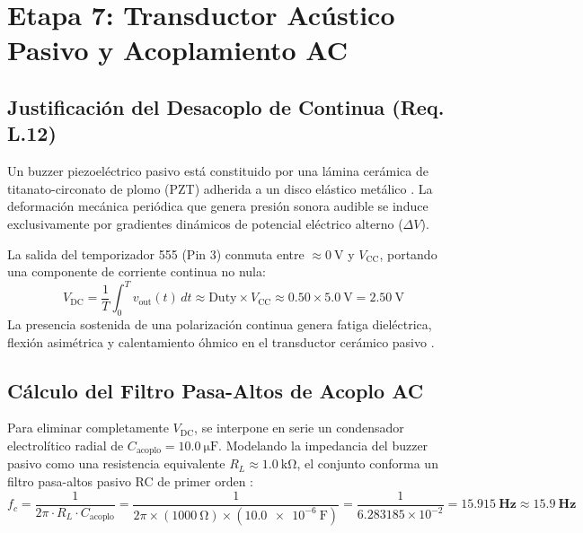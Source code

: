 \documentclass[11pt,letterpaper]{article}
\begin{document}
\section{Etapa 7: Transductor Acústico Pasivo y Acoplamiento AC}

\subsection{Justificación del Desacoplo de Continua (Req. L.12)}
Un buzzer piezoeléctrico pasivo está constituido por una lámina cerámica de titanato-circonato de plomo (PZT) adherida a un disco elástico metálico \cite{cady1964}. La deformación mecánica periódica que genera presión sonora audible se induce exclusivamente por gradientes dinámicos de potencial eléctrico alterno ($\Delta V$).

La salida del temporizador 555 (Pin 3) conmuta entre $\approx \SI{0}{\volt}$ y $V_{\text{CC}}$, portando una componente de corriente continua no nula:
\begin{equation}
V_{\text{DC}} = \frac{1}{T}\int_0^T v_{\text{out}}(t)\,dt \approx \mathrm{Duty} \times V_{\text{CC}} \approx 0.50 \times \SI{5.0}{\volt} = \SI{2.50}{\volt}
\end{equation}
La presencia sostenida de una polarización continua genera fatiga dieléctrica, flexión asimétrica y calentamiento óhmico en el transductor cerámico pasivo \cite{cady1964}.

\subsection{Cálculo del Filtro Pasa-Altos de Acoplo AC}
Para eliminar completamente $V_{\text{DC}}$, se interpone en serie un condensador electrolítico radial de $C_{\text{acoplo}} = \SI{10.0}{\micro\farad}$. Modelando la impedancia del buzzer pasivo como una resistencia equivalente $R_L \approx \SI{1.0}{\kilo\ohm}$, el conjunto conforma un filtro pasa-altos pasivo RC de primer orden \cite{alexander2018}:
\begin{equation}
f_c = \frac{1}{2\pi \cdot R_L \cdot C_{\text{acoplo}}} = \frac{1}{2\pi \times (\SI{1000}{\ohm}) \times (\SI{10.0e-6}{\farad})} = \frac{1}{6.283185 \times 10^{-2}} = \mathbf{\SI{15.915}{\hertz}} \approx \mathbf{\SI{15.9}{\hertz}}
\label{eq:fc_acoplo}
\end{equation}
\end{document}

